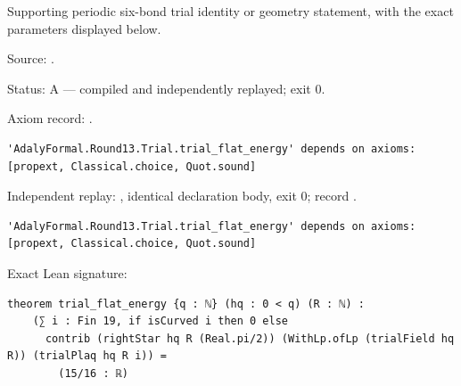 \begin{theorem}[bp-428]
\label{bp-428}
\leanok
Supporting periodic six-bond trial identity or geometry statement, with the exact parameters displayed below.

\par Source: \texttt{}.
\par Status: A — compiled and independently replayed; exit 0.
\par Axiom record: \texttt{}.
\begin{verbatim}
'AdalyFormal.Round13.Trial.trial_flat_energy' depends on axioms: [propext, Classical.choice, Quot.sound]
\end{verbatim}
\par Independent replay: \texttt{}, identical declaration body, exit 0; record \texttt{}.
\begin{verbatim}
'AdalyFormal.Round13.Trial.trial_flat_energy' depends on axioms: [propext, Classical.choice, Quot.sound]
\end{verbatim}
\par Exact Lean signature:
\begin{verbatim}
theorem trial_flat_energy {q : ℕ} (hq : 0 < q) (R : ℕ) :
    (∑ i : Fin 19, if isCurved i then 0 else
      contrib (rightStar hq R (Real.pi/2)) (WithLp.ofLp (trialField hq R)) (trialPlaq hq R i)) =
        (15/16 : ℝ)
\end{verbatim}
\end{theorem}

